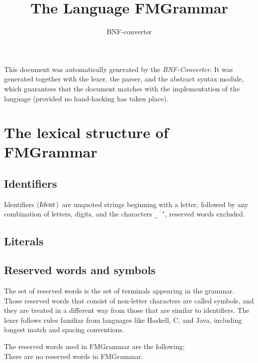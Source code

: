 \documentclass[a4paper,11pt]{article}
\author{BNF-converter}
\title{The Language FMGrammar}
\begin{document}
\maketitle

\newcommand{\emptyP}{\mbox{$\epsilon$}}
\newcommand{\terminal}[1]{\mbox{{\texttt {#1}}}}
\newcommand{\nonterminal}[1]{\mbox{$\langle \mbox{{\sl #1 }} \! \rangle$}}
\newcommand{\arrow}{\mbox{::=}}
\newcommand{\delimit}{\mbox{$|$}}
\newcommand{\reserved}[1]{\mbox{{\texttt {#1}}}}
\newcommand{\literal}[1]{\mbox{{\texttt {#1}}}}
\newcommand{\symb}[1]{\mbox{{\texttt {#1}}}}

This document was automatically generated by the {\em BNF-Converter}. It was generated together with the lexer, the parser, and the abstract syntax module, which guarantees that the document matches with the implementation of the language (provided no hand-hacking has taken place).

\section*{The lexical structure of FMGrammar}
\subsection*{Identifiers}
Identifiers \nonterminal{Ident} are unquoted strings beginning with a letter,
followed by any combination of letters, digits, and the characters {\tt \_ '},
reserved words excluded.


\subsection*{Literals}


\subsection*{Reserved words and symbols}
The set of reserved words is the set of terminals appearing in the grammar. Those reserved words that consist of non-letter characters are called symbols, and they are treated in a different way from those that are similar to identifiers. The lexer follows rules familiar from languages like Haskell, C, and Java, including longest match and spacing conventions.

The reserved words used in FMGrammar are the following: \\

There are no reserved words in FMGrammar.\\
\end{document}
